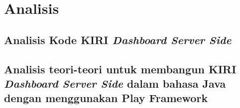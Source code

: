 \chapter{Analisis}
\label{chap:analisis}

\section{Analisis Kode KIRI \textit{Dashboard Server Side}}
\label{sec:analisiskiri}

\section{Analisis teori-teori untuk membangun KIRI \textit{Dashboard Server Side} dalam bahasa Java
dengan menggunakan Play Framework}
\label{sec:analisisplay}
